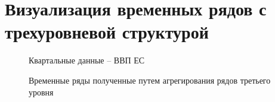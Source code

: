 \documentclass[12pt,a4paper, oneside]{extreport}
\begin{document}
\chapter[Визуализация временных рядов с трехуровневой структурой]{Визуализация временных рядов с трехуровневой структурой}\label{app-a}
\begin{figure}[H]
	\caption{Временные ряды полученные путем агрегирования рядов третьего уровня }
	\label{otkl_1}

	\centering\footnotesize{Квартальные данные -- ВВП ЕС }
		
	\begin{minipage}[H]{0.4\linewidth}
	\end{minipage}
	\begin{minipage}[H]{0.4\linewidth}

\end{minipage}
\end{figure}
\end{document}
